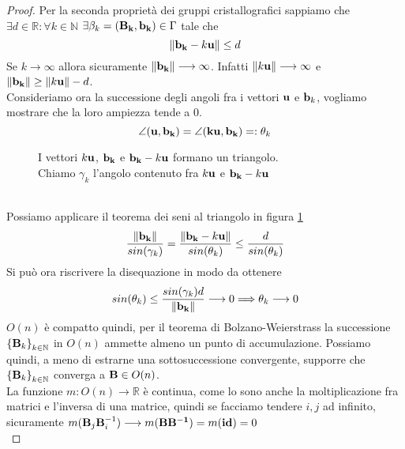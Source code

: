 \documentclass[a4paper,11pt,openright,twoside	]{book}
\begin{document}
\begin{proof}
Per la seconda proprietà dei gruppi cristallografici sappiamo che \\
$ \exists d \in \mathbb{R} : \forall k \in \mathbb{N} $ $  \exists \beta_k = \vb{( B_k, b_k)} \in \Gamma  $ tale che 
\[  \norm{\vb{b_k }- k\vb{u }} \leq d \]
Se $k \longrightarrow \infty$ allora sicuramente $ \norm{\vb{b_k}} \longrightarrow \infty$.  
Infatti $\norm{ k\vb{u }}  \longrightarrow \infty$ e $\norm{\vb{b_k}} \geq \norm{ k\vb{u }} - d $.\\
Consideriamo ora la successione degli angoli fra i vettori $\vb{u}$ e $\vb{b}_k$, vogliamo mostrare che la loro ampiezza tende a 0. 
\[ \angle (\vb{u , b_k}) = \angle (\vb{ku, b_k}) = : \theta_k \]
\begin{figure}[!h]
\centering
{}
\caption{I vettori $k \vb{u}$, $\vb{b_k}$ e $\vb{b_k}-k\vb{u}$ formano un triangolo. \\ Chiamo $\gamma_k$ l'angolo contenuto fra $k \vb{u}$ e $\vb{b_k}-k\vb{u}$}
\label{fig:trangolo1}
\end{figure} \\
Possiamo applicare il teorema dei seni al triangolo in figura \ref{fig:trangolo1}
\[ \frac{\norm{\vb{b_k}}}{sin(\gamma_k)} = \frac{\norm{\vb{b_k} - k\vb{u}}}{sin(\theta_k)}  \leq \frac{d}{sin(\theta_k)} \]
Si può ora riscrivere la disequazione in modo da ottenere
\[  sin(\theta_k) \leq \frac{sin(\gamma_k)d}{\norm{\vb{b_k}}} \longrightarrow 0 \Longrightarrow \theta_k \longrightarrow 0 \]
$O(n)$  è compatto quindi, per il teorema di Bolzano-Weierstrass  la successione ${ \{\vb{B}_k \} }_{k \in \mathbb{N}}$  in  $O(n)$  ammette almeno un punto di accumulazione. Possiamo quindi, a meno di estrarne una sottosuccessione convergente, supporre che  ${ \{ \vb{B}_k \}}_{k \in \mathbb{N}}$ converga a $\vb{B} \in O(n)$. \\
La funzione  $ m: O(n) \longrightarrow \mathbb{R}$  è continua, come lo sono anche la moltiplicazione fra matrici e l'inversa di una matrice,  quindi se facciamo tendere $i,j$ ad infinito, sicuramente $m(\vb{B}_j \vb{B}^{-1}_i) \longrightarrow m(\vb{B B^{-1}}) = m(\vb{id}) = 0 $ \\

\end{proof}
\end{document}
